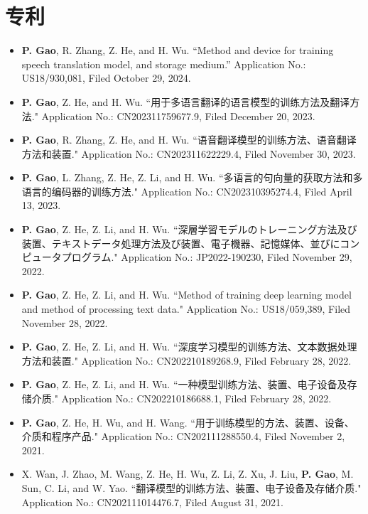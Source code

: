 \documentclass{resume}
\begin{document}
\section{专利}
\begin{itemize}[parsep=0.2ex]

\item {{\bf P. Gao}, R. Zhang, Z. He, and H. Wu. ``Method and device for training speech translation model, and storage medium.'' Application No.: US18/930,081, Filed October 29, 2024.}

\item {{\bf P. Gao}, Z. He, and H. Wu. ``用于多语言翻译的语言模型的训练方法及翻译方法." Application No.: CN202311759677.9, Filed December 20, 2023.}

\item {{\bf P. Gao}, R. Zhang, Z. He, and H. Wu. ``语音翻译模型的训练方法、语音翻译方法和装置." Application No.: CN202311622229.4, Filed November 30, 2023.}

\item {{\bf P. Gao}, L. Zhang, Z. He, Z. Li, and H. Wu. ``多语言的句向量的获取方法和多语言的编码器的训练方法." Application No.: CN202310395274.4, Filed April 13, 2023.}

\item {{\bf P. Gao}, Z. He, Z. Li, and H. Wu. ``深層学習モデルのトレーニング方法及び装置、テキストデータ処理方法及び装置、電子機器、記憶媒体、並びにコンピュータプログラム." Application No.: JP2022-190230, Filed November 29, 2022.}

\item {{\bf P. Gao}, Z. He, Z. Li, and H. Wu. ``Method of training deep learning model and method of processing text data." Application No.: US18/059,389, Filed November 28, 2022.}

\item {{\bf P. Gao}, Z. He, Z. Li, and H. Wu. ``深度学习模型的训练方法、文本数据处理方法和装置." Application No.: CN202210189268.9, Filed February 28, 2022.}

\item {{\bf P. Gao}, Z. He, Z. Li, and H. Wu. ``一种模型训练方法、装置、电子设备及存储介质." Application No.: CN202210186688.1, Filed February 28, 2022.}

\item {{\bf P. Gao}, Z. He, H. Wu, and H. Wang. ``用于训练模型的方法、装置、设备、介质和程序产品." Application No.: CN202111288550.4, Filed November 2, 2021.}

\item {X. Wan, J. Zhao, M. Wang, Z. He, H. Wu, Z. Li, Z. Xu, J. Liu, {\bf P. Gao}, M. Sun, C. Li, and W. Yao. ``翻译模型的训练方法、装置、电子设备及存储介质." Application No.: CN202111014476.7, Filed August 31, 2021.}


\end{itemize}
\end{document}
